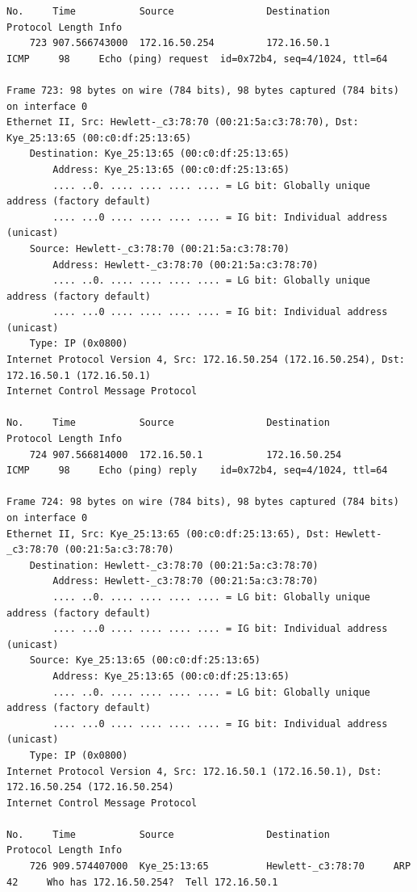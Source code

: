 \documentclass[a4paper,11pt]{article}
\begin{document}
\begin{lstlisting}
No.     Time           Source                Destination           Protocol Length Info
    723 907.566743000  172.16.50.254         172.16.50.1           ICMP     98     Echo (ping) request  id=0x72b4, seq=4/1024, ttl=64

Frame 723: 98 bytes on wire (784 bits), 98 bytes captured (784 bits) on interface 0
Ethernet II, Src: Hewlett-_c3:78:70 (00:21:5a:c3:78:70), Dst: Kye_25:13:65 (00:c0:df:25:13:65)
    Destination: Kye_25:13:65 (00:c0:df:25:13:65)
        Address: Kye_25:13:65 (00:c0:df:25:13:65)
        .... ..0. .... .... .... .... = LG bit: Globally unique address (factory default)
        .... ...0 .... .... .... .... = IG bit: Individual address (unicast)
    Source: Hewlett-_c3:78:70 (00:21:5a:c3:78:70)
        Address: Hewlett-_c3:78:70 (00:21:5a:c3:78:70)
        .... ..0. .... .... .... .... = LG bit: Globally unique address (factory default)
        .... ...0 .... .... .... .... = IG bit: Individual address (unicast)
    Type: IP (0x0800)
Internet Protocol Version 4, Src: 172.16.50.254 (172.16.50.254), Dst: 172.16.50.1 (172.16.50.1)
Internet Control Message Protocol

No.     Time           Source                Destination           Protocol Length Info
    724 907.566814000  172.16.50.1           172.16.50.254         ICMP     98     Echo (ping) reply    id=0x72b4, seq=4/1024, ttl=64

Frame 724: 98 bytes on wire (784 bits), 98 bytes captured (784 bits) on interface 0
Ethernet II, Src: Kye_25:13:65 (00:c0:df:25:13:65), Dst: Hewlett-_c3:78:70 (00:21:5a:c3:78:70)
    Destination: Hewlett-_c3:78:70 (00:21:5a:c3:78:70)
        Address: Hewlett-_c3:78:70 (00:21:5a:c3:78:70)
        .... ..0. .... .... .... .... = LG bit: Globally unique address (factory default)
        .... ...0 .... .... .... .... = IG bit: Individual address (unicast)
    Source: Kye_25:13:65 (00:c0:df:25:13:65)
        Address: Kye_25:13:65 (00:c0:df:25:13:65)
        .... ..0. .... .... .... .... = LG bit: Globally unique address (factory default)
        .... ...0 .... .... .... .... = IG bit: Individual address (unicast)
    Type: IP (0x0800)
Internet Protocol Version 4, Src: 172.16.50.1 (172.16.50.1), Dst: 172.16.50.254 (172.16.50.254)
Internet Control Message Protocol

No.     Time           Source                Destination           Protocol Length Info
    726 909.574407000  Kye_25:13:65          Hewlett-_c3:78:70     ARP      42     Who has 172.16.50.254?  Tell 172.16.50.1


\end{lstlisting}
\end{document}
